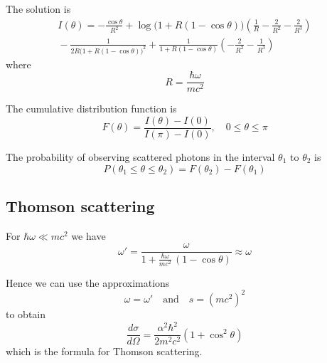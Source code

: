 \documentclass[12pt]{article}
\begin{document}
The solution is
\begin{multline*}
I(\theta)=-\frac{\cos\theta}{R^2}
+\log\big(1+R(1-\cos\theta)\big)\left(\frac{1}{R}-\frac{2}{R^2}-\frac{2}{R^3}\right)
\\
{}-\frac{1}{2R\big(1+R(1-\cos\theta)\big)^2}
+\frac{1}{1+R(1-\cos\theta)}\left(-\frac{2}{R^2}-\frac{1}{R^3}\right)
\end{multline*}
where
\begin{equation*}
R=\frac{\hbar\omega}{mc^2}
\end{equation*}

\iffalse
Here is a computer solution for $I(\theta)$ where $\text{\tt R}\equiv\hbar\omega/mc^2$.
\begin{verbatim}
I = -R^2 / (-R^3 + R^3 cos(theta) - R^2) -
    R / (-R^3 + R^3 cos(theta) - R^2) +
    2 R / (-R^4 + R^4 cos(theta) - R^3) -
    1 / (R (R (-cos(theta) + 1) + 1)) -
    1 / (2 R (R (-cos(theta) + 1) + 1)^2) +
    log(R - R cos(theta) + 1) / R -
    cos(theta) / R^2 -
    2 log(R - R cos(theta) + 1) / R^2 -
    2 log(R - R cos(theta) + 1) / R^3 +
    1 / (-R^4 + R^4 cos(theta) - R^3) -
    1 / (R (-cos(theta) + 1) + 1)
\end{verbatim}
\fi

The cumulative distribution function is
\begin{equation*}
F(\theta)=\frac{I(\theta)-I(0)}{I(\pi)-I(0)},
\quad
0\le\theta\le\pi
\end{equation*}

The probability of observing scattered photons in the interval $\theta_1$ to $\theta_2$ is
\begin{equation*}
P(\theta_1\le\theta\le\theta_2)=F(\theta_2)-F(\theta_1)
\end{equation*}

\subsection*{Thomson scattering}
For $\hbar\omega\ll mc^2$ we have
\begin{equation*}
\omega'=\frac{\omega}{1+\frac{\hbar\omega}{mc^2}\,(1-\cos\theta)}\approx\omega
\end{equation*}

Hence we can use the approximations
\begin{equation*}
\omega=\omega'\quad\text{and}\quad s=(mc^2)^2
\end{equation*}
to obtain
\begin{equation*}
\frac{d\sigma}{d\Omega}=\frac{\alpha^2\hbar^2}{2m^2c^2}\left(1+\cos^2\theta\right)
\end{equation*}
which is the formula for Thomson scattering.
\end{document}
